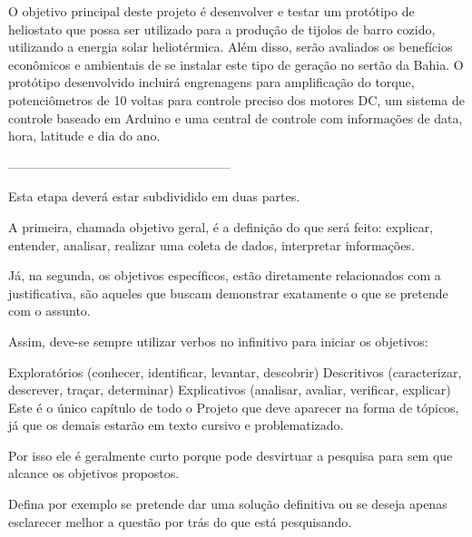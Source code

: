 O objetivo principal deste projeto é desenvolver e testar um protótipo de heliostato que possa ser utilizado para a produção de tijolos de barro cozido, utilizando a energia solar heliotérmica. Além disso, serão avaliados os benefícios econômicos e ambientais de se instalar este tipo de geração no sertão da Bahia. O protótipo desenvolvido incluirá engrenagens para amplificação do torque, potenciômetros de 10 voltas para controle preciso dos motores DC, um sistema de controle baseado em Arduino e uma central de controle com informações de data, hora, latitude e dia do ano.

-----------------------------------------------------

Esta etapa deverá estar subdividido em duas partes.

A primeira, chamada objetivo geral, é a definição do que será feito: explicar, entender, analisar, realizar uma coleta de dados, interpretar informações.

Já, na segunda, os objetivos específicos, estão diretamente relacionados com a justificativa, são aqueles que buscam demonstrar exatamente o que se pretende com o assunto.

Assim, deve-se sempre utilizar verbos no infinitivo para iniciar os objetivos:

Exploratórios (conhecer, identificar, levantar, descobrir)
Descritivos (caracterizar, descrever, traçar, determinar)
Explicativos (analisar, avaliar, verificar, explicar)
Este é o único capítulo de todo o Projeto que deve aparecer na forma de tópicos, já que os demais estarão em texto cursivo e problematizado.

Por isso ele é geralmente curto porque pode desvirtuar a pesquisa para sem que alcance os objetivos propostos.

Defina por exemplo se pretende dar uma solução definitiva ou se deseja apenas esclarecer melhor a questão por trás do que está pesquisando.



